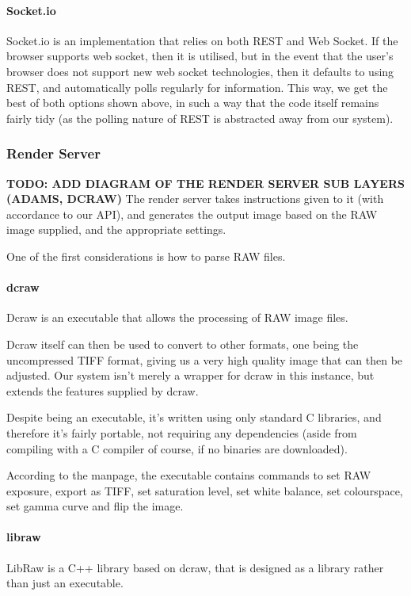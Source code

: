 \documentclass[12pt,a4paper]{article}
\begin{document}
\paragraph{Socket.io}
Socket.io is an implementation that relies on both REST and Web Socket.
If the browser supports web socket, then it is utilised, but in the event that the
user's browser does not support new web socket technologies, then it defaults to
using REST, and automatically polls regularly for information. This way, we get the
best of both options shown above, in such a way that the code itself remains fairly
tidy (as the polling nature of REST is abstracted away from our system).

\subsubsection{Render Server}
\textbf{TODO: ADD DIAGRAM OF THE RENDER SERVER SUB LAYERS (ADAMS, DCRAW)}
The render server takes instructions given to it (with accordance to our API), and
generates the output image based on the RAW image supplied, and the appropriate settings.

One of the first considerations is how to parse RAW files.

\paragraph{dcraw}
Dcraw is an executable that allows the processing of RAW image files.

Dcraw itself can then be used to convert to other formats, one being the uncompressed TIFF format,
giving us a very high quality image that can then be adjusted. Our system isn't merely a wrapper for
dcraw in this instance, but extends the features supplied by dcraw.

Despite being an executable, it's written using only standard C libraries, and therefore it's
fairly portable, not requiring any dependencies (aside from compiling with a C compiler of course, if
no binaries are downloaded). \cite{DcrawWebsite}

According to the manpage, the executable contains commands to set RAW exposure, export as TIFF,
set saturation level, set white balance, set colourspace, set gamma curve and flip the image. \cite{DcrawManpage}


\paragraph{libraw}
LibRaw is a C++ library based on dcraw, that is designed as a library rather than just
an executable.
\end{document}
